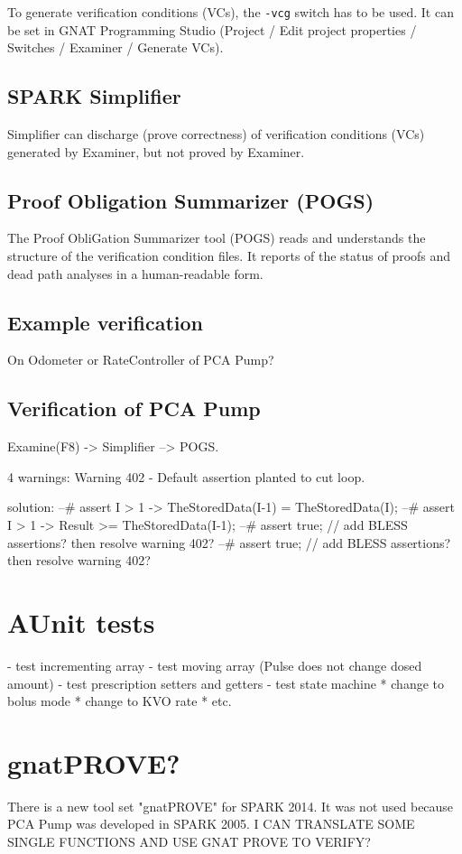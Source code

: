 To generate verification conditions (VCs), the \lstinline{-vcg} switch has to be used. It can be set in GNAT Programming Studio (Project / Edit project properties / Switches / Examiner / Generate VCs).


\subsection{SPARK Simplifier}

Simplifier can discharge (prove correctness) of verification conditions (VCs) generated by Examiner, but not proved by Examiner. \cite{Simplifier:Online} 


\subsection{Proof Obligation Summarizer (POGS)}

The Proof ObliGation Summarizer tool (POGS) reads and understands the structure of the verification condition files. It reports of the status of proofs and dead path analyses in a human-readable form. \cite{POGS:Online}


\subsection{Example verification}

On Odometer or RateController of PCA Pump?

\subsection{Verification of PCA Pump}

Examine(F8) -> Simplifier --> POGS.

4 warnings:
Warning 402 - Default assertion planted to cut loop.

solution:
--# assert I > 1 -> TheStoredData(I-1) = TheStoredData(I);
--# assert I > 1 -> Result >= TheStoredData(I-1);
--# assert true; // add BLESS assertions? then resolve warning 402?
--# assert true; // add BLESS assertions? then resolve warning 402?




\section{AUnit tests}
- test incrementing array
- test moving array (Pulse does not change dosed amount)
- test prescription setters and getters
- test state machine
	* change to bolus mode
	* change to KVO rate
	* etc.



\section{gnatPROVE?}

There is a new tool set "gnatPROVE" for SPARK 2014. It was not used because PCA Pump was developed in SPARK 2005.
I CAN TRANSLATE SOME SINGLE FUNCTIONS AND USE GNAT PROVE TO VERIFY?
